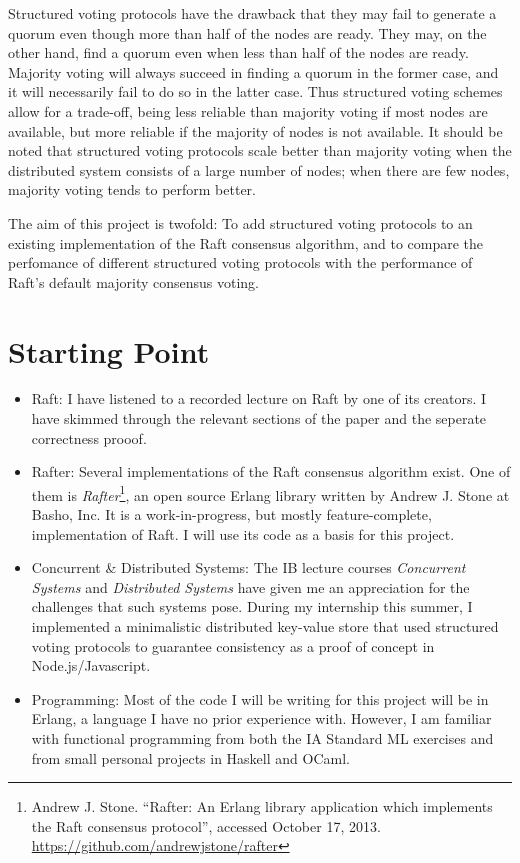 \documentclass[12pt]{scrartcl}
\begin{document}
Structured voting protocols have the drawback that they may fail to generate a quorum even though more than half of the nodes are ready. They may, on the other hand, find a quorum even when less than half of the nodes are ready. Majority voting will always succeed in finding a quorum in the former case, and it will necessarily fail to do so in the latter case. Thus structured voting schemes allow for a trade-off, being less reliable than majority voting if most nodes are available, but more reliable if the majority of nodes is not available. It should be noted that structured voting protocols scale better than majority voting when the distributed system consists of a large number of nodes; when there are few nodes, majority voting tends to perform better.

The aim of this project is twofold: To add structured voting protocols to an existing implementation of the Raft consensus algorithm, and to compare the perfomance of different structured voting protocols with the performance of Raft's default majority consensus voting.


\section{Starting Point%
  \label{starting-point}%
}
%
\begin{itemize}

\item Raft: I have listened to a recorded lecture on Raft by one of its creators. I have skimmed through the relevant sections of the paper and the seperate correctness prooof.

\item Rafter: Several implementations of the Raft consensus algorithm exist. One of them is \emph{Rafter}\footnote{Andrew J. Stone. “Rafter: An Erlang library application which implements the Raft consensus protocol”, accessed October 17, 2013. \url{https://github.com/andrewjstone/rafter}}, an open source Erlang library written by Andrew J. Stone at Basho, Inc. It is a work-in-progress, but mostly feature-complete, implementation of Raft. I will use its code as a basis for this project.

\item Concurrent \& Distributed Systems: The IB lecture courses \emph{Concurrent Systems} and \emph{Distributed Systems} have given me an appreciation for the challenges that such systems pose. During my internship this summer, I implemented a minimalistic distributed key-value store that used structured voting protocols to guarantee consistency as a proof of concept in Node.js/Javascript.

\item Programming: Most of the code I will be writing for this project will be in Erlang, a language I have no prior experience with. However, I am familiar with functional programming from both the IA Standard ML exercises and from small personal projects in Haskell and OCaml.

\end{itemize}
\end{document}
